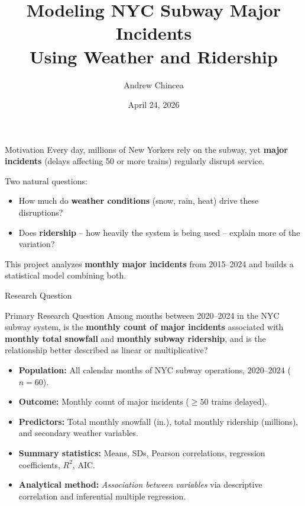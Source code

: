 \documentclass[aspectratio=43]{beamer}
\title[MTA Major Incidents vs. Weather \& Ridership]{Modeling NYC Subway Major Incidents\\Using Weather and Ridership}
\author[Andrew Chincea]{Andrew Chincea}
\institute[KSU]{DATA 3230 -- Data Visualization Final Project\\Kennesaw State University}
\date{April 24, 2026}
\begin{document}
\begin{frame}
  \titlepage
\end{frame}

\begin{frame}{Motivation}
Every day, millions of New Yorkers rely on the subway, yet \textbf{major incidents} (delays affecting 50 or more trains) regularly disrupt service.

\vspace{0.3cm}
Two natural questions:
\begin{itemize}
  \item How much do \textbf{weather conditions} (snow, rain, heat) drive these disruptions?
  \item Does \textbf{ridership} -- how heavily the system is being used -- explain more of the variation?
\end{itemize}

\vspace{0.3cm}
This project analyzes \textbf{monthly major incidents} from 2015--2024 and builds a statistical model combining both.
\end{frame}

\begin{frame}{Research Question}
\begin{block}{Primary Research Question}
Among months between 2020--2024 in the NYC subway system, is the \textbf{monthly count of major incidents} associated with \textbf{monthly total snowfall} and \textbf{monthly subway ridership}, and is the relationship better described as linear or multiplicative?
\end{block}
\small
\begin{itemize}
  \item \textbf{Population:} All calendar months of NYC subway operations, 2020--2024 ($n=60$).
  \item \textbf{Outcome:} Monthly count of major incidents ($\ge 50$ trains delayed).
  \item \textbf{Predictors:} Total monthly snowfall (in.), total monthly ridership (millions), and secondary weather variables.
  \item \textbf{Summary statistics:} Means, SDs, Pearson correlations, regression coefficients, $R^2$, AIC.
  \item \textbf{Analytical method:} \emph{Association between variables} via descriptive correlation and inferential multiple regression.
\end{itemize}
\end{frame}
\end{document}
